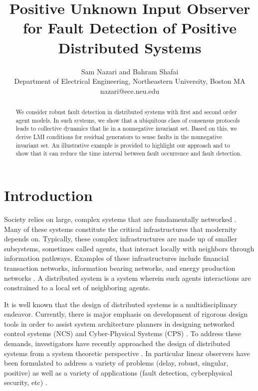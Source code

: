 \documentclass[letterpaper, 10 pt, conference]{ieeeconf}  %
\title{\Large \bf
Positive Unknown Input Observer for Fault Detection of Positive Distributed Systems}
\author{\parbox{7 in}{\centering Sam Nazari and Bahram Shafai \\
          Department of Electrical Engineering, Northeastern University, Boston MA\\ nazari@ece.neu.edu
}}%
\begin{document}
\maketitle
\thispagestyle{empty}
\pagestyle{empty}


\begin{abstract}
We consider robust fault detection in distributed systems with first and second order agent models. In such systems, we show that a ubiquitous class of consensus protocols leads to collective dynamics that lie in a nonnegative invariant set. Based on this, we derive LMI conditions for residual generators to sense faults in the nonnegative invariant set. An illustrative example is provided to highlight our approach and to show that it can reduce the time interval between fault occurrence and fault detection. 
\end{abstract}

\section{Introduction} \label{sec:intro}
Society relies on large, complex systems that are fundamentally networked \cite{wolf_safety_2018,nazari_distributed_2016}. Many of these systems constitute the critical infrastructures that modernity depends on. Typically, these complex infrastructures are made up of smaller subsystems, sometimes called agents, that interact locally with neighbors through information pathways.  Examples of these infrastructures include financial transaction networks, information bearing networks, and energy production networks \cite{pasqualetti_control-theoretic_2015}. A distributed system is a system wherein such agents interactions are constrained to a local set of neighboring agents. 

It is well known that the design of distributed systems is a multidisciplinary endeavor. Currently, there is major emphasis on development of rigorous design tools in order to assist system architecture planners in designing networked control systems (NCS) and Cyber-Physical Systems (CPS) \cite{teixeira_attack_2012,pasqualetti_control-theoretic_2015}. To address these demands, investigators have recently approached the design of distributed systems from a system theoretic perspective \cite{pasqualetti_control-theoretic_2015}. In particular linear observers have been formulated to address a variety of  problems (delay, robust, singular, positive) \cite{oreilly_observers_1983,shafai_proportional-integral_2015} as well as a variety of applications (fault detection, cyberphysical security, etc) \cite{chen_robust_1999,teixeira_distributed_2014}. 
\end{document}
